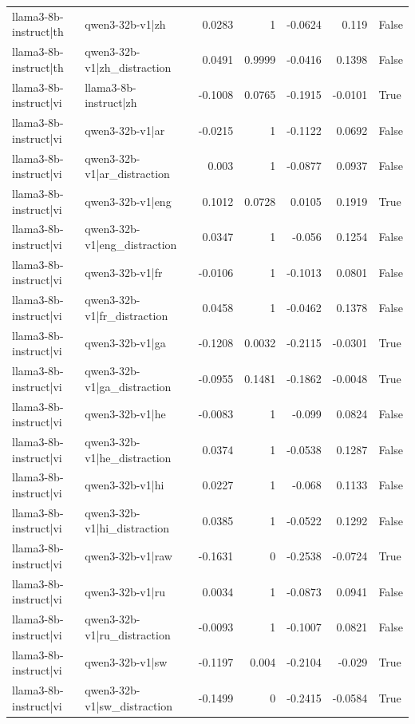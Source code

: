 \begin{table}
\begin{tabular}{l l r r r r l}
llama3-8b-instruct|th & qwen3-32b-v1|zh & 0.0283 & 1 & -0.0624 & 0.119 & False \\
llama3-8b-instruct|th & qwen3-32b-v1|zh_distraction & 0.0491 & 0.9999 & -0.0416 & 0.1398 & False \\
llama3-8b-instruct|vi & llama3-8b-instruct|zh & -0.1008 & 0.0765 & -0.1915 & -0.0101 & True \\
llama3-8b-instruct|vi & qwen3-32b-v1|ar & -0.0215 & 1 & -0.1122 & 0.0692 & False \\
llama3-8b-instruct|vi & qwen3-32b-v1|ar_distraction & 0.003 & 1 & -0.0877 & 0.0937 & False \\
llama3-8b-instruct|vi & qwen3-32b-v1|eng & 0.1012 & 0.0728 & 0.0105 & 0.1919 & True \\
llama3-8b-instruct|vi & qwen3-32b-v1|eng_distraction & 0.0347 & 1 & -0.056 & 0.1254 & False \\
llama3-8b-instruct|vi & qwen3-32b-v1|fr & -0.0106 & 1 & -0.1013 & 0.0801 & False \\
llama3-8b-instruct|vi & qwen3-32b-v1|fr_distraction & 0.0458 & 1 & -0.0462 & 0.1378 & False \\
llama3-8b-instruct|vi & qwen3-32b-v1|ga & -0.1208 & 0.0032 & -0.2115 & -0.0301 & True \\
llama3-8b-instruct|vi & qwen3-32b-v1|ga_distraction & -0.0955 & 0.1481 & -0.1862 & -0.0048 & True \\
llama3-8b-instruct|vi & qwen3-32b-v1|he & -0.0083 & 1 & -0.099 & 0.0824 & False \\
llama3-8b-instruct|vi & qwen3-32b-v1|he_distraction & 0.0374 & 1 & -0.0538 & 0.1287 & False \\
llama3-8b-instruct|vi & qwen3-32b-v1|hi & 0.0227 & 1 & -0.068 & 0.1133 & False \\
llama3-8b-instruct|vi & qwen3-32b-v1|hi_distraction & 0.0385 & 1 & -0.0522 & 0.1292 & False \\
llama3-8b-instruct|vi & qwen3-32b-v1|raw & -0.1631 & 0 & -0.2538 & -0.0724 & True \\
llama3-8b-instruct|vi & qwen3-32b-v1|ru & 0.0034 & 1 & -0.0873 & 0.0941 & False \\
llama3-8b-instruct|vi & qwen3-32b-v1|ru_distraction & -0.0093 & 1 & -0.1007 & 0.0821 & False \\
llama3-8b-instruct|vi & qwen3-32b-v1|sw & -0.1197 & 0.004 & -0.2104 & -0.029 & True \\
llama3-8b-instruct|vi & qwen3-32b-v1|sw_distraction & -0.1499 & 0 & -0.2415 & -0.0584 & True \\

\end{tabular}
\end{table}
